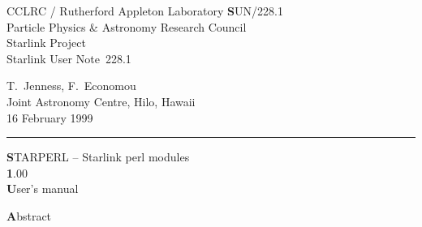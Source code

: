 \documentclass[twoside,11pt]{article}
\newcommand{\stardoccategory}  {Starlink User Note}
\newcommand{\stardocinitials}  {SUN}
\newcommand{\stardocnumber}    {228.1}
\newcommand{\stardocauthors}   {T.\ Jenness, F.\ Economou\\
                                Joint Astronomy Centre, Hilo, Hawaii}
\newcommand{\stardocdate}      {16 February 1999}
\newcommand{\stardoctitle}     {STARPERL -- Starlink perl modules}
\newcommand{\stardocversion}   {1.00}
\newcommand{\stardocmanual}    {User's manual}
\newcommand{\stardocname}{\stardocinitials /\stardocnumber}
\newenvironment{latexonly}{}{}
\renewcommand{\_}{\texttt{\symbol{95}}}
\begin{document}
\thispagestyle{empty}

\begin{latexonly}
   CCLRC / {\textsc Rutherford Appleton Laboratory} \hfill {\textbf \stardocname}\\
   {\large Particle Physics \& Astronomy Research Council}\\
   {\large Starlink Project\\}
   {\large \stardoccategory\ \stardocnumber}
   \begin{flushright}
   \stardocauthors\\
   \stardocdate
   \end{flushright}
   \vspace{-4mm}
   \rule{\textwidth}{0.5mm}
   \vspace{5mm}
   \begin{center}
   {\Huge\textbf  \stardoctitle \\ [2.5ex]}
   {\LARGE\textbf \stardocversion \\ [4ex]}
   {\Huge\textbf  \stardocmanual}
   \end{center}
   \vspace{5mm}


   \vspace{10mm}
   \begin{center}
      {\Large\textbf Abstract}
   \end{center}
\end{latexonly}
\end{document}

